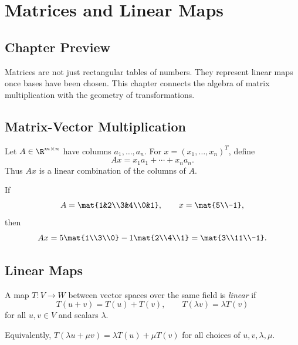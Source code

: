 \chapter{Matrices and Linear Maps}
\label{ch:matrices-linear-maps}

\section*{Chapter Preview}

Matrices are not just rectangular tables of numbers. They represent linear
maps once bases have been chosen. This chapter connects the algebra of matrix
multiplication with the geometry of transformations.

\section{Matrix-Vector Multiplication}

Let $A\in\R^{m\times n}$ have columns $a_1,\ldots,a_n$. For
$x=(x_1,\ldots,x_n)^T$, define
\[
  Ax=x_1a_1+\cdots+x_na_n.
\]
Thus $Ax$ is a linear combination of the columns of $A$.

\begin{example}
If
\[
  A=\mat{1&2\\3&4\\0&1},\qquad x=\mat{5\\-1},
\]
then
\[
  Ax=5\mat{1\\3\\0}-1\mat{2\\4\\1}
    =\mat{3\\11\\-1}.
\]
\end{example}

\section{Linear Maps}

\begin{definition}
  A map $T:V\to W$ between vector spaces over the same field is \emph{linear}
  if
  \[
    T(u+v)=T(u)+T(v),
    \qquad
    T(\lambda v)=\lambda T(v)
  \]
  for all $u,v\in V$ and scalars $\lambda$.
\end{definition}

Equivalently, $T(\lambda u+\mu v)=\lambda T(u)+\mu T(v)$ for all choices of
$u,v,\lambda,\mu$.

